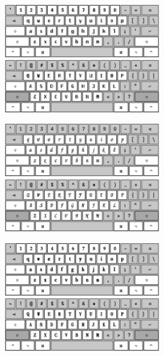 \documentclass[letter,10pt]{article}
\begin{document}
\includegraphics[width=0.5\textwidth]{pics/doublestruck-lc.png}%
\includegraphics[width=0.5\textwidth]{pics/doublestruck-shift.png}
\vspace{2mm}

\includegraphics[width=0.5\textwidth]{pics/mathscript-lc.png}%
\includegraphics[width=0.5\textwidth]{pics/mathscript-shift.png}
\vspace{2mm}

\includegraphics[width=0.5\textwidth]{pics/mathbold-lc.png}%
\includegraphics[width=0.5\textwidth]{pics/mathbold-shift.png}
\end{document}
